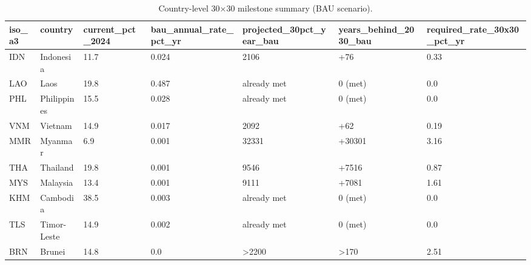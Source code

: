 \begin{table}[htbp]
\centering
\small
\begin{tabular}{lllllll}
\hline
iso\_a3 & country & current\_pct\_2024 & bau\_annual\_rate\_pct\_yr & projected\_30pct\_year\_bau & years\_behind\_2030\_bau & required\_rate\_30x30\_pct\_yr \\
\hline
IDN & Indonesia & 11.7 & 0.024 & 2106 & +76 & 0.33 \\
LAO & Laos & 19.8 & 0.487 & already met & 0 (met) & 0.0 \\
PHL & Philippines & 15.5 & 0.028 & already met & 0 (met) & 0.0 \\
VNM & Vietnam & 14.9 & 0.017 & 2092 & +62 & 0.19 \\
MMR & Myanmar & 6.9 & 0.001 & 32331 & +30301 & 3.16 \\
THA & Thailand & 19.8 & 0.001 & 9546 & +7516 & 0.87 \\
MYS & Malaysia & 13.4 & 0.001 & 9111 & +7081 & 1.61 \\
KHM & Cambodia & 38.5 & 0.003 & already met & 0 (met) & 0.0 \\
TLS & Timor-Leste & 14.9 & 0.002 & already met & 0 (met) & 0.0 \\
BRN & Brunei & 14.8 & 0.0 & >2200 & >170 & 2.51 \\
\hline
\end{tabular}
\caption{Country-level 30×30 milestone summary (BAU scenario).}
\label{tab:pathway_country}
\end{table}